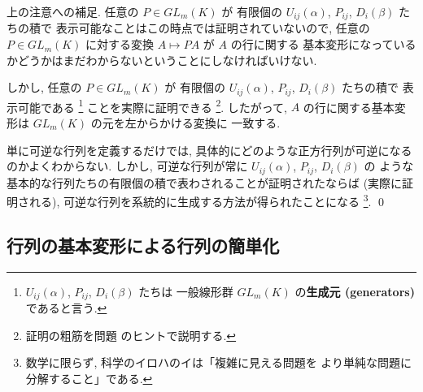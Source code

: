 \documentclass[12pt,twoside]{jarticle}
\begin{document}
\begin{guide}
  \label{guide:elem-tr-2}
  上の注意への補足. 任意の $P\in GL_m(K)$ が
  有限個の $U_{ij}(\alpha)$, $P_{ij}$, $D_i(\beta)$ たちの積で
  表示可能なことはこの時点では証明されていないので, 
  任意の $P\in GL_m(K)$ に対する変換 $A\mapsto PA$ が $A$ の行に関する
  基本変形になっているかどうかはまだわからないということにしなければいけない.

  しかし, 任意の $P\in GL_m(K)$ が
  有限個の $U_{ij}(\alpha)$, $P_{ij}$, $D_i(\beta)$ たちの積で
  表示可能である%
  \footnote{$U_{ij}(\alpha)$, $P_{ij}$, $D_i(\beta)$ たちは
    一般線形群 $GL_m(K)$ の{\bf 生成元 (generators)} であると言う.}%
  ことを実際に証明できる%
  \footnote{証明の粗筋を問題  のヒントで説明する.}. 
  したがって, $A$ の行に関する基本変形は $GL_m(K)$ の元を左からかける変換に
  一致する.

  単に可逆な行列を定義するだけでは, 
  具体的にどのような正方行列が可逆になるのかよくわからない.  
  しかし, 可逆な行列が常に $U_{ij}(\alpha)$, $P_{ij}$, $D_i(\beta)$ の
  ような基本的な行列たちの有限個の積で表わされることが証明されたならば
  (実際に証明される), 可逆な行列を系統的に生成する方法が得られたことになる%
  \footnote{数学に限らず, 科学のイロハのイは「複雑に見える問題を
    より単純な問題に分解すること」である.}.
  \qed
\end{guide}


\subsection{行列の基本変形による行列の簡単化}
\label{sec:simplify}

\end{document}
